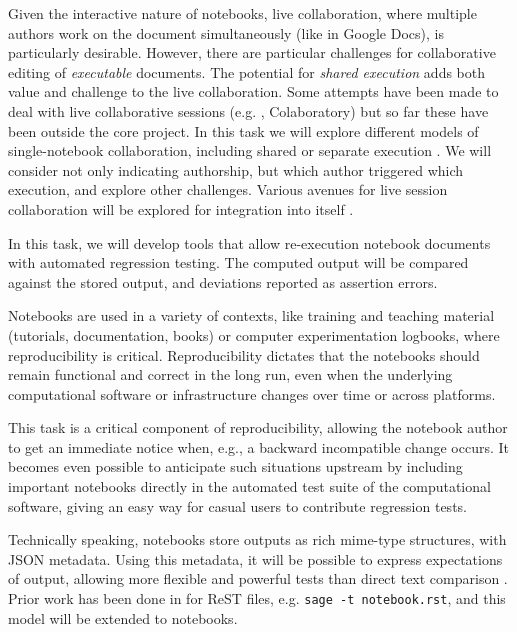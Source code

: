 \begin{workpackage}
\begin{tasklist}
\begin{task}[id=notebook-collab,title=Notebook improvements for collaboration,lead=SR, partners={PS,USH,JU,FAU,USO,LL}, PM=20, wphases=0-24, issue=70]
  Given the interactive nature of \Jupyter notebooks, live
  collaboration, where multiple authors work on the document
  simultaneously (like in Google Docs), is particularly
  desirable. However, there are particular challenges for
  collaborative editing of \emph{executable} documents. The potential
  for \emph{shared execution} adds both value and challenge to the
  live collaboration. Some attempts have been made to deal with live
  collaborative sessions (e.g. \SMC, Colaboratory) but so far these
  have been outside the core \Jupyter project. In this task we will
  explore different models of single-notebook collaboration, including
  shared or separate execution . We will
  consider not only indicating authorship, but which author
  triggered which execution, and explore other challenges.  Various
  avenues for live session collaboration will be explored for
  integration into \Jupyter itself
  .
\end{task}

\begin{task}[id=notebook-verification,title=Reproducible Notebooks,lead=SR, partners={PS,USO}, PM=4, wphases=12-24, issue=71]
  In this task, we will develop tools that allow re-execution
  notebook documents with automated regression testing. The computed
  output will be compared against the stored output, and deviations
  reported as assertion errors.

  Notebooks are used in a variety of contexts, like training and
  teaching material (tutorials, documentation, books) or computer
  experimentation logbooks, where reproducibility is
  critical. Reproducibility dictates that the notebooks should remain
  functional and correct in the long run, even when the underlying
  computational software or infrastructure changes over time or across
  platforms.

  This task is a critical component of reproducibility, allowing the
  notebook author to get an immediate notice when, e.g., a backward
  incompatible change occurs. It becomes even possible to anticipate
  such situations upstream by including important notebooks directly
  in the automated test suite of the computational software, giving an
  easy way for casual users to contribute regression tests.

  Technically speaking, \Jupyter notebooks store outputs as rich
  mime-type structures, with JSON metadata. Using this metadata, it
  will be possible to express expectations of output, allowing more
  flexible and powerful tests than direct text comparison
  .  Prior work has been done in \Sage for
  ReST files, e.g. \lstinline{sage -t notebook.rst}, and this model
  will be extended to notebooks.
\end{task}


\end{tasklist}
\end{workpackage}
